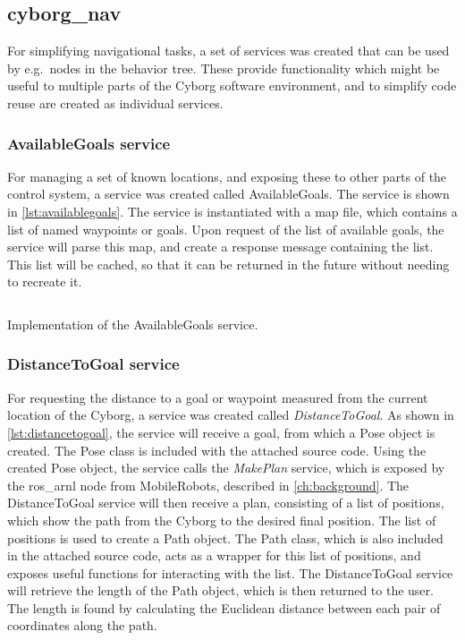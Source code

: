 \documentclass[\rootfolder/main.tex]{subfiles}
\begin{document}
\subsection{cyborg\_nav}

For simplifying navigational tasks, a set of services was created that can be used by e.g.\ nodes in the behavior tree.
These provide functionality which might be useful to multiple parts of the Cyborg software environment, and to simplify code reuse are created as individual services.

\subsubsection{AvailableGoals service}

For managing a set of known locations, and exposing these to other parts of the control system, a service was created called AvailableGoals.
The service is shown in \cref{lst:availablegoals}.
The service is instantiated with a map file, which contains a list of named waypoints or goals.
Upon request of the list of available goals, the service will parse this map, and create a response message containing the list.
This list will be cached, so that it can be returned in the future without needing to recreate it.

\begin{listing}
    \inputminted[fontsize=\scriptsize]{python}{\rootfolder/Chapters/Chapter6/Listings/available_goals.py}
    \caption{Implementation of the AvailableGoals service.}
    \label{lst:availablegoals}
\end{listing}

\subsubsection{DistanceToGoal service}

For requesting the distance to a goal or waypoint measured from the current location of the Cyborg, a service was created called \emph{DistanceToGoal}.
As shown in \cref{lst:distancetogoal}, the service will receive a goal, from which a Pose object is created.
The Pose class is included with the attached source code.
Using the created Pose object, the service calls the \emph{MakePlan} service, which is exposed by the ros\_arnl node from MobileRobots, described in \cref{ch:background}.
The DistanceToGoal service will then receive a plan, consisting of a list of positions, which show the path from the Cyborg to the desired final position.
The list of positions is used to create a Path object.
The Path class, which is also included in the attached source code, acts as a wrapper for this list of positions, and exposes useful functions for interacting with the list.
The DistanceToGoal service will retrieve the length of the Path object, which is then returned to the user.
The length is found by calculating the Euclidean distance between each pair of coordinates along the path.
\end{document}
